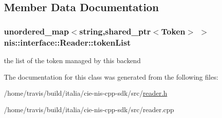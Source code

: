 \subsection{Member Data Documentation}
\hypertarget{classnis_1_1interface_1_1Reader_a42d9beab85b111103582f3297fac667b}{
\subsubsection[{token\-List}]{\setlength{\rightskip}{0pt plus 5cm}unordered\-\_\-map$<$string,shared\-\_\-ptr$<${\bf Token}$>$ $>$ nis\-::interface\-::\-Reader\-::token\-List\hspace{0.3cm}{\ttfamily [protected]}}}\label{classnis_1_1interface_1_1Reader_a42d9beab85b111103582f3297fac667b}
the list of the token managed by this backend 

The documentation for this class was generated from the following files\-:\begin{DoxyCompactItemize}
\item 
/home/travis/build/italia/cie-\/nis-\/cpp-\/sdk/src/\hyperlink{reader_8h}{reader.\-h}\item 
/home/travis/build/italia/cie-\/nis-\/cpp-\/sdk/src/reader.\-cpp\end{DoxyCompactItemize}

